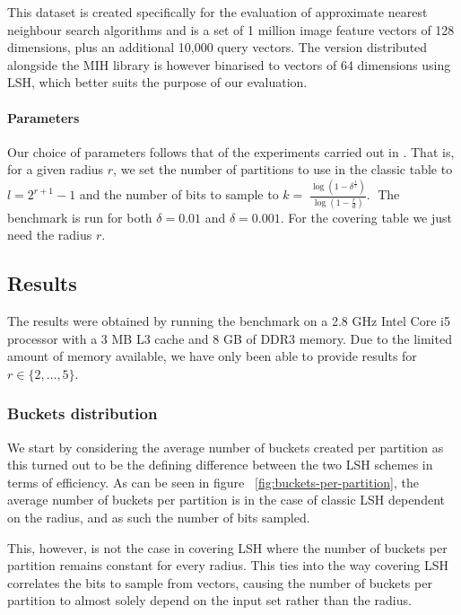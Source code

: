 This dataset is created specifically for the evaluation of approximate nearest neighbour search algorithms and is a set of 1 million image feature vectors of 128 dimensions, plus an additional 10,000 query vectors. The version distributed alongside the MIH library is however binarised to vectors of 64 dimensions using LSH, which better suits the purpose of our evaluation.

\paragraph{Parameters} Our choice of parameters follows that of the experiments carried out in \cite{DBLP:journals/corr/PhamP16}. That is, for a given radius $r$, we set the number of partitions to use in the classic table to $l = 2^{r + 1} - 1$ and the number of bits to sample to $k = 􏰢\frac{\log(1 - \delta^{\frac{1}{l}})}{\log(1 - \frac{r}{d})}$.􏰣 The benchmark is run for both $\delta = 0.01$ and $\delta = 0.001$. For the covering table we just need the radius $r$.

\subsection{Results}

The results were obtained by running the benchmark on a 2.8 GHz Intel Core i5 processor with a 3 MB L3 cache and 8 GB of DDR3 memory. Due to the limited amount of memory available, we have only been able to provide results for $r \in \{2,\ldots,5\}$.

\subsubsection{Buckets distribution}

We start by considering the average number of buckets created per partition as this turned out to be the defining difference between the two LSH schemes in terms of efficiency. As can be seen in figure ~\ref{fig:buckets-per-partition}, the average number of buckets per partition is in the case of classic LSH dependent on the radius, and as such the number of bits sampled.

This, however, is not the case in covering LSH where the number of buckets per partition remains constant for every radius. This ties into the way covering LSH correlates the bits to sample from vectors, causing the number of buckets per partition to almost solely depend on the input set rather than the radius.

